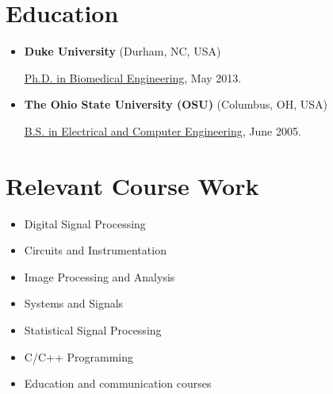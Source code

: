 \documentclass[letterpaper,10pt,english]{sphinxmanual}
\begin{document}
\chapter{Education}
\label{resume:education}\begin{itemize}
\item {} 
\textbf{Duke University} (Durham, NC, USA)

\href{http://bme.duke.edu/grad}{Ph.D. in Biomedical Engineering}, May
2013.

\item {} 
\textbf{The Ohio State University (OSU)} (Columbus, OH, USA)

\href{http://ece.osu.edu/futurestudents/undergrad}{B.S. in Electrical and Computer
Engineering}, June
2005.

\end{itemize}


\chapter{Relevant Course Work}
\label{resume:relevant-course-work}\begin{itemize}
\item {} 
Digital Signal Processing

\item {} 
Circuits and Instrumentation

\item {} 
Image Processing and Analysis

\item {} 
Systems and Signals

\item {} 
Statistical Signal Processing

\item {} 
C/C++ Programming

\item {} 
Education and communication courses

\end{itemize}
\end{document}
